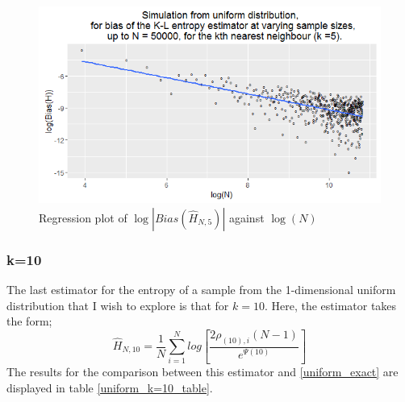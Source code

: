 \documentclass{article}
\begin{document}
\begin{figure}
  \begin{center}
    \includegraphics[width=\textwidth]{./Graphs/Uniform_k=5_plot.png}
  \end{center}
\caption{Regression plot of $\log|Bias(\hat{H}_{N, 5})|$ against $\log(N)$}
  \label{uniform_k=5_graph}
\end{figure}




\subsubsection{k=10} \label{U_k=10}
The last estimator for the entropy of a sample from the 1-dimensional uniform distribution that I wish to explore is that for $k=10$. Here, the estimator takes the form;
\begin{equation}
\hat{H}_{N, 10} = \frac{1}{N} \sum_{i=1}^{N} log \left[ \frac{2\rho_{(10),i}(N-1)}{e^{\Psi(10)}} \right] \nonumber
\end{equation}
The results for the comparison between this estimator and \ref{uniform_exact} are displayed in table \ref{uniform_k=10_table}.
\end{document}
